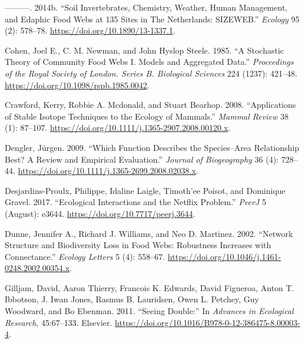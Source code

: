 \documentclass{article}
\newlength{\cslhangindent}
\newlength{\cslentryspacingunit} %
\newenvironment{CSLReferences}[2] %
 {%
  \setlength{\parindent}{0pt}
  \ifodd #1
  \let\oldpar\par
  \def\par{\hangindent=\cslhangindent\oldpar}
  \fi
  \setlength{\parskip}{#2\cslentryspacingunit}
 }%
 {}
\begin{document}
\begin{CSLReferences}{1}{0}
\leavevmode{}%
---------. 2014b. {``Soil Invertebrates, Chemistry, Weather, Human
Management, and Edaphic Food Webs at 135 Sites in The Netherlands:
SIZEWEB.''} \emph{Ecology} 95 (2): 578--78.
\url{https://doi.org/10.1890/13-1337.1}.

\leavevmode{}%
Cohen, Joel E., C. M. Newman, and John Hyslop Steele. 1985. {``A
Stochastic Theory of Community Food Webs {I}. {Models} and Aggregated
Data.''} \emph{Proceedings of the Royal Society of London. Series B.
Biological Sciences} 224 (1237): 421--48.
\url{https://doi.org/10.1098/rspb.1985.0042}.

\leavevmode{}%
Crawford, Kerry, Robbie A. Mcdonald, and Stuart Bearhop. 2008.
{``Applications of Stable Isotope Techniques to the Ecology of
Mammals.''} \emph{Mammal Review} 38 (1): 87--107.
\url{https://doi.org/10.1111/j.1365-2907.2008.00120.x}.

\leavevmode{}%
Dengler, Jürgen. 2009. {``Which Function Describes the Species--Area
Relationship Best? {A} Review and Empirical Evaluation.''} \emph{Journal
of Biogeography} 36 (4): 728--44.
\url{https://doi.org/10.1111/j.1365-2699.2008.02038.x}.

\leavevmode{}%
Desjardins-Proulx, Philippe, Idaline Laigle, Timoth'ee Poisot, and
Dominique Gravel. 2017. {``Ecological Interactions and the {Netflix}
Problem.''} \emph{PeerJ} 5 (August): e3644.
\url{https://doi.org/10.7717/peerj.3644}.

\leavevmode{}%
Dunne, Jennifer A., Richard J. Williams, and Neo D. Martinez. 2002.
{``Network Structure and Biodiversity Loss in Food Webs: Robustness
Increases with Connectance.''} \emph{Ecology Letters} 5 (4): 558--67.
\url{https://doi.org/10.1046/j.1461-0248.2002.00354.x}.

\leavevmode{}%
Gilljam, David, Aaron Thierry, Francois K. Edwards, David Figueroa,
Anton T. Ibbotson, J. Iwan Jones, Rasmus B. Lauridsen, Owen L. Petchey,
Guy Woodward, and Bo Ebenman. 2011. {``Seeing {Double}:''} In
\emph{Advances in {Ecological Research}}, 45:67--133. {Elsevier}.
\url{https://doi.org/10.1016/B978-0-12-386475-8.00003-4}.


\end{CSLReferences}
\end{document}
